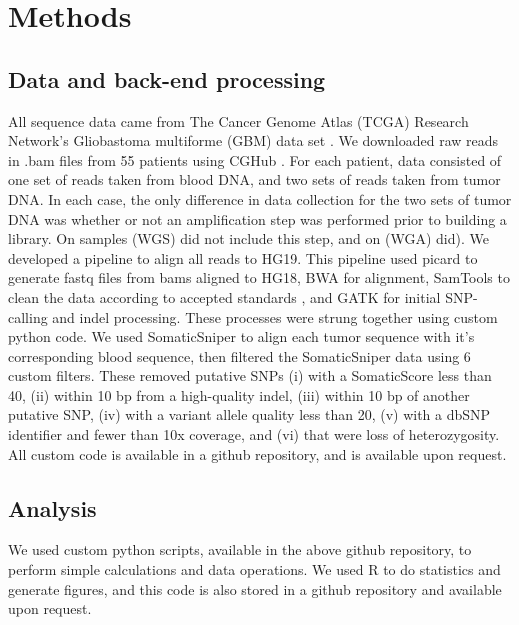 \documentclass[11pt]{article} %
\begin{document}

\section{Methods}

\subsection{Data and back-end processing}

All sequence data came from The Cancer Genome Atlas (TCGA) Research Network's Gliobastoma multiforme (GBM) data set \cite{TCGA-GBM}. We downloaded raw reads in .bam files from 55 patients using CGHub \cite{CGHub}. For each patient, data consisted of one set of reads taken from blood DNA, and two sets of reads taken from tumor DNA. In each case, the only difference in data collection for the two sets of tumor DNA was whether or not an amplification step was performed prior to building a library. On samples (WGS) did not include this step, and on (WGA) did). We developed a pipeline to align all reads to HG19. This pipeline used picard \cite{picard} to generate fastq files from bams aligned to HG18, BWA \cite{BWA} for alignment, SamTools \cite{SAMtools} to clean the data according to accepted standards \cite{seq-standards}, and GATK \cite{GATK} for initial SNP-calling and indel processing. These processes were strung together using custom python code. We used SomaticSniper \cite{SomaticSniper} to align each tumor sequence with it's corresponding blood sequence, then filtered the SomaticSniper data using 6 custom filters. These removed putative SNPs (i) with a SomaticScore less than 40, (ii) within 10 bp from a high-quality indel, (iii) within 10 bp of another putative SNP, (iv) with a variant allele quality less than 20, (v) with a dbSNP \cite{dbSNP} identifier and fewer than 10x coverage, and (vi) that were loss of heterozygosity. All custom code is available in a github repository, and is available upon request.

\subsection{Analysis}

We used custom python scripts, available in the above github repository, to perform simple calculations and data operations. We used R \cite{Rsoftware} to do statistics and generate figures, and this code is also stored in a github repository and available upon request.  
\end{document}
